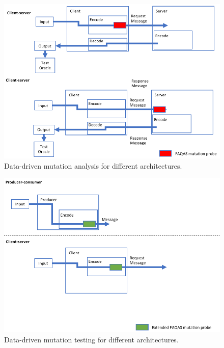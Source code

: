 \begin{figure}[h]
  \centering
    \includegraphics[width=14cm]{images/dataDrivenTestSuiteAugmentationE}
      \caption{Data-driven mutation analysis for different architectures.}
      \label{fig:dataDrivenTestSuiteAugmentationE}
\end{figure}

\begin{figure}[h]
  \centering
    \includegraphics[width=14cm]{images/dataDrivenTestSuiteAugmentationB}
      \caption{Data-driven mutation testing for different architectures.}
      \label{fig:dataDrivenTestSuiteAugmentationB}
\end{figure}

\ENDCHANGEDWPT



